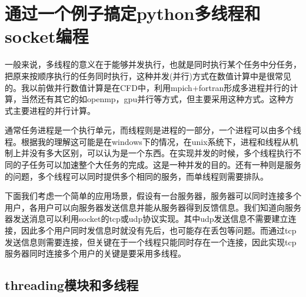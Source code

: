 \documentclass[twoside,11pt]{book}
\begin{document}
\chapter{通过一个例子搞定python多线程和socket编程}

一般来说，多线程的意义在于能够并发执行，也就是同时执行某个任务中分任务，把原来按顺序执行的任务同时执行，这种并发(并行)方式在数值计算中是很常见的。我以前做并行数值计算是在CFD中，利用mpich+fortran形成多进程并行的计算，当然还有其它的如openmp，gpu并行等方式，但主要采用这种方式。这种方式主要进程的并行计算。

通常任务进程是一个执行单元，而线程则是进程的一部分，一个进程可以由多个线程。根据我的理解这可能是在windows下的情况，在unix系统下，进程和线程从机制上并没有多大区别，可以认为是一个东西。在实现并发的时候，多个线程执行不同的子任务可以加速整个大任务的完成。这是一种并发的目的。还有一种则是服务的问题，多个线程可以同时提供多个相同的服务，而单线程则需要排队。

下面我们考虑一个简单的应用场景，假设有一台服务器，服务器可以同时连接多个用户，各用户可以向服务器发送信息并能从服务器得到反馈信息。我们知道向服务器发送消息可以利用socket的tcp或udp协议实现。其中udp发送信息不需要建立连接，因此多个用户同时发信息时就没有先后，也可能存在丢包等问题。而通过tcp发送信息则需要连接，但关键在于一个线程只能同时存在一个连接，因此实现tcp服务器同时连接多个用户的关键是要采用多线程。

\section{threading模块和多线程}
\end{document}
